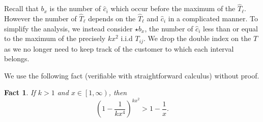 \documentclass[11pt]{article}
\newtheorem{fact}[theorem]{Fact}
\theoremstyle{definition}
\begin{document}
Recall that $b_x$ is the number of $\widehat{c}_i$ which occur before the maximum of the
$\widehat{T}_\ell$.  However the number of $\widehat{T}_\ell$ depends on the $\widehat{T}_\ell$ and $\widehat{c}_i$
in a complicated manner.  To simplify the analysis, we instead consider $\star{b}_x$, the number of $\widehat{c}_i$
less than or equal to the maximum of the precisely $kx^2$ i.i.d $T_{ij}$.  We drop the double index on the $T$ as we no longer
need to keep track of the customer to which each interval belongs.  

We use the following fact (verifiable with straightforward calculus) without proof.  

\begin{fact}
    \label{fact}
    If $k>1$ and $x\in \left[1,\infty\right)$, then
    \[\left(1-\frac{1}{kx^4}\right)^{kx^2} > 1 - \frac{1}{x}.\]
\end{fact}
\end{document}
